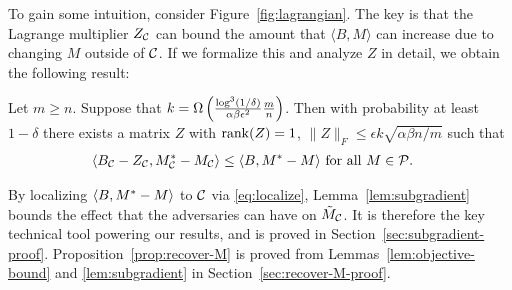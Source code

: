 
To gain some intuition, consider 
Figure~\ref{fig:lagrangian}. The key is that the Lagrange 
multiplier $Z_{\mathcal{C}}$ can bound the amount that $\langle B, M \rangle$ 
can increase due to changing $M$ outside of $\mathcal{C}$.
If we formalize this and analyze $Z$ in detail, we obtain the 
following result:
\begin{lemma}
\label{lem:subgradient}
Let $m \geq n$. Suppose that $k = \Omega\left( \frac{\log^3(1/\delta)}{\alpha\beta\epsilon^2}\frac{m}{n} \right)$. 
Then with probability at least $1-\delta$ there exists a matrix $Z$ with 
$\operatorname{rank}(Z) = 1$, $\|Z\|_F \leq \epsilon k\sqrt{\alpha\beta n/m}$ such that
\begin{align}
\label{eq:localize}
\langle B_{\mathcal{C}} - Z_{\mathcal{C}}, M^*_{\mathcal{C}} - M_{\mathcal{C}} \rangle &\leq \langle B, M^* - M \rangle \text{ for all $M \in \mathcal{P}$}.
\end{align}
\end{lemma}
By localizing $\langle B, M^* - M \rangle$ to $\mathcal{C}$ via 
\eqref{eq:localize}, 
Lemma~\ref{lem:subgradient} bounds the effect that the adversaries can have 
on $\tilde{M}_{\mathcal{C}}$. It is therefore the key 
technical tool powering our results, and is proved in 
Section~\ref{sec:subgradient-proof}. Proposition~\ref{prop:recover-M} 
is proved from Lemmas~\ref{lem:objective-bound} and \ref{lem:subgradient} 
in Section~\ref{sec:recover-M-proof}.

